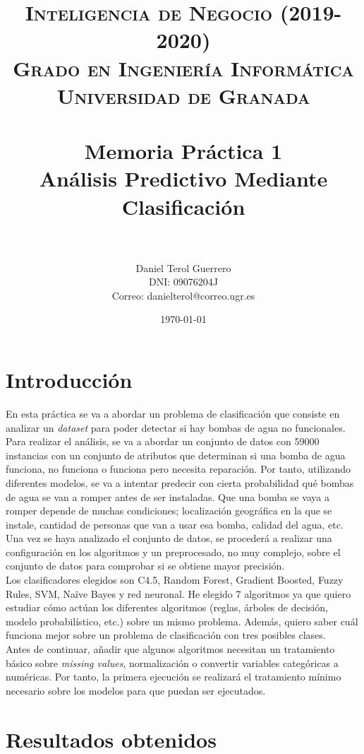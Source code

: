 \documentclass[paper=a4, fontsize=12pt]{article} %
\title{ 
\normalfont \normalsize 
\textsc{{\bf Inteligencia de Negocio (2019-2020)} \\ Grado en Ingeniería Informática \\ Universidad de Granada} \\ [25pt] %
\horrule{0.5pt} \\[0.4cm] %
\huge Memoria Práctica 1 \\ Análisis Predictivo Mediante Clasificación\\%
\horrule{2pt} \\[0.5cm] %
}
\author{Daniel Terol Guerrero\\DNI: 09076204J\\Correo: danielterol@correo.ugr.es} %
\date{\normalsize\today} %
\numberwithin{equation}{section} %
\numberwithin{figure}{section} %
\numberwithin{table}{section} %
\begin{document}
\maketitle %
\newpage %

\tableofcontents %
\newpage
{}

\section{Introducción}
\large En esta práctica se va a abordar un problema de clasificación que consiste en analizar un \textit{dataset} para poder detectar si hay bombas de agua no funcionales. Para realizar el análisis, se va a abordar un conjunto de datos con 59000 instancias con un conjunto de atributos que determinan si una bomba de agua funciona, no funciona o funciona pero necesita reparación. Por tanto, utilizando diferentes modelos, se va a intentar predecir con cierta probabilidad qué bombas de agua se van a romper antes de ser instaladas. Que una bomba se vaya a romper depende de muchas condiciones; localización geográfica en la que se instale, cantidad de personas que van a usar esa bomba, calidad del agua, etc. Una vez se haya analizado el conjunto de datos, se procederá a realizar una configuración en los algoritmos y un preprocesado, no muy complejo, sobre el conjunto de datos para comprobar si se obtiene mayor precisión. \\

Los clasificadores elegidos son C4.5, Random Forest, Gradient Boosted, Fuzzy Rules, SVM, Naïve Bayes y red neuronal. He elegido 7 algoritmos ya que quiero estudiar cómo actúan los diferentes algoritmos (reglas, árboles de decisión, modelo probabilístico, etc.) sobre un mismo problema. Además, quiero saber cuál funciona mejor sobre un problema de clasificación con tres posibles clases. \\

Antes de continuar, añadir que algunos algoritmos necesitan un tratamiento básico sobre \textit{missing values}, normalización o convertir variables categóricas a numéricas. Por tanto, la primera ejecución se realizará el tratamiento mínimo necesario sobre los modelos para que puedan ser ejecutados.
\newpage
\section{Resultados obtenidos}
\end{document}

